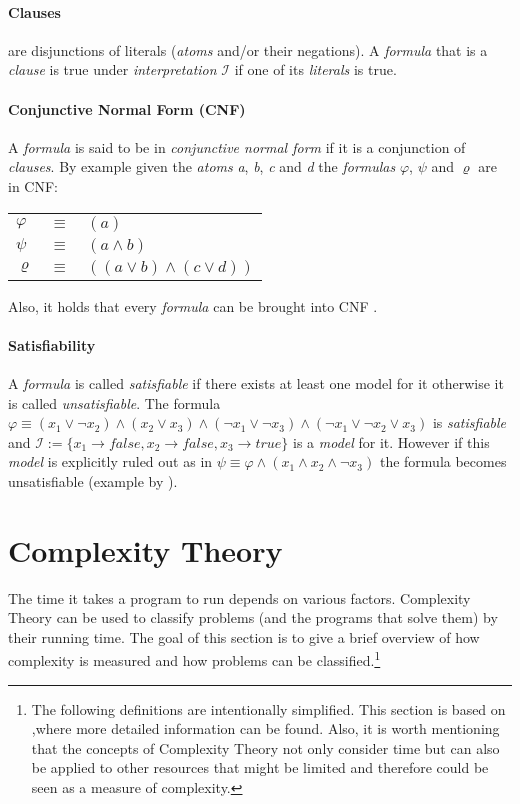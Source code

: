 \paragraph{Clauses}
are disjunctions of literals (\emph{atoms} and/or their negations). A \emph{formula} that is a \emph{clause} is true under \emph{interpretation} $\mathcal{I}$ if one of its \emph{literals} is true.

\paragraph{Conjunctive Normal Form (CNF)}
A \emph{formula} is said to be in \emph{conjunctive normal form} if it is a conjunction of \emph{clauses}. 
By example given the \emph{atoms} \emph{a}, \emph{b}, \emph{c} and \emph{d} the \emph{formulas} $\varphi$, $\psi$ and $\varrho$ are in CNF:
\begin{center}
    \begin{tabular}{ l l l }
    $\varphi$ & $\equiv$ & $(a)$\\
    $\psi$ & $\equiv$ & $(a \land b)$\\
    $\varrho$ & $\equiv$ & $((a \lor b) \land (c \lor d))$\\
\end{tabular}
\end{center}
Also, it holds that every \emph{formula} can be brought into CNF \cite{LogicForComputerScientists}.

\paragraph{Satisfiability} \label{Satisfiability} A \emph{formula} is called \emph{satisfiable} if there exists at least one model for it otherwise it is called \emph{unsatisfiable}. The formula $\varphi \equiv (x_1 \lor \neg x_2) \land (x_2 \lor x_3) \land (\neg x_1 \lor \neg x_3) \land (\neg x_1 \lor \neg x_2 \lor x_3)$ is \emph{satisfiable} and $\mathcal{I}:= \{x_1 \rightarrow false, x_2 \rightarrow false, x_3 \rightarrow true\}$ is a \emph{model} for it. However if this \emph{model} is explicitly ruled out as in $\psi \equiv \varphi \land (x_1 \land x_2 \land \neg x_3)$ the formula becomes unsatisfiable (example by \cite{10.5555/1121689}).


\section{Complexity Theory}
The time it takes a program to run depends on various factors. Complexity Theory can be used to classify problems (and the programs that solve them) by their running time. The goal of this section is to give a brief overview of how complexity is measured and how problems can be classified.\footnote{The following definitions are intentionally simplified. This section is based on \cite{IntroductionToTheTheoryOfComputation},where more detailed information can be found. Also, it is worth mentioning that the concepts of Complexity Theory not only consider time but can also be applied to other resources that might be limited and therefore could be seen as a measure of complexity.}


